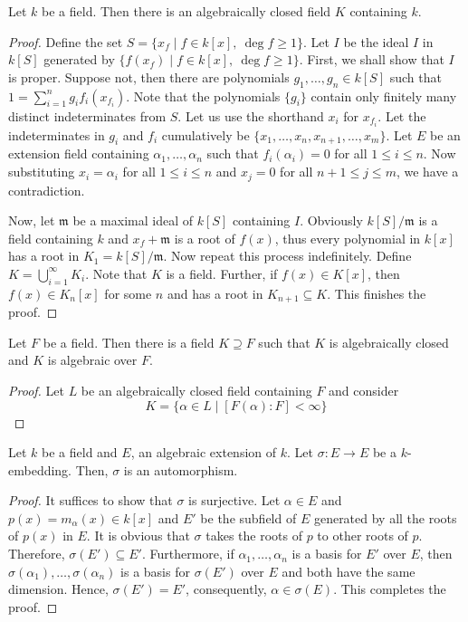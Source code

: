 \begin{theorem}
    Let $k$ be a field. Then there is an algebraically closed field $K$ containing $k$.
\end{theorem}
\begin{proof}
    Define the set $S = \{x_f\mid f\in k[x],~\deg f\ge 1\}$. Let $I$ be the ideal $I$ in $k[S]$ generated by $\{f(x_f)\mid f\in k[x],~\deg f\ge 1\}$. First, we shall show that $I$ is proper. Suppose not, then there are polynomials $g_1,\ldots,g_n\in k[S]$ such that $1 = \sum_{i = 1}^ng_if_i(x_{f_i})$. Note that the polynomials $\{g_i\}$ contain only finitely many distinct indeterminates from $S$. Let us use the shorthand $x_i$ for $x_{f_i}$. Let the indeterminates in $g_i$ and $f_i$ cumulatively be $\{x_1,\ldots,x_n,x_{n + 1},\ldots,x_m\}$. Let $E$ be an extension field containing $\alpha_1,\ldots,\alpha_n$ such that $f_i(\alpha_i) = 0$ for all $1\le i\le n$. Now substituting $x_i = \alpha_i$ for all $1\le i\le n$ and $x_j = 0$ for all $n + 1\le j\le m$, we have a contradiction.


    Now, let $\mathfrak{m}$ be a maximal ideal of $k[S]$ containing $I$. Obviously $k[S]/\mathfrak{m}$ is a field containing $k$ and $x_f + \mathfrak{m}$ is a root of $f(x)$, thus every polynomial in $k[x]$ has a root in $K_1 = k[S]/\mathfrak{m}$. Now repeat this process indefinitely. Define $K = \bigcup_{i = 1}^\infty K_i$. Note that $K$ is a field. Further, if $f(x)\in K[x]$, then $f(x)\in K_n[x]$ for some $n$ and has a root in $K_{n + 1}\subseteq K$. This finishes the proof.
\end{proof}

\begin{corollary}
    Let $F$ be a field. Then there is a field $K\supseteq F$ such that $K$ is algebraically closed and $K$ is algebraic over $F$.
\end{corollary}
\begin{proof}
    Let $L$ be an algebraically closed field containing $F$ and consider 
    \begin{equation*}
        K = \{\alpha\in L\mid [F(\alpha):F] < \infty\}
    \end{equation*}
\end{proof}

\begin{theorem}
    Let $k$ be a field and $E$, an algebraic extension of $k$. Let $\sigma:E\to E$ be a $k$-embedding. Then, $\sigma$ is an automorphism.
\end{theorem}
\begin{proof}
    It suffices to show that $\sigma$ is surjective. Let $\alpha\in E$ and $p(x) = m_\alpha(x)\in k[x]$ and $E'$ be the subfield of $E$ generated by all the roots of $p(x)$ in $E$. It is obvious that $\sigma$ takes the roots of $p$ to other roots of $p$. Therefore, $\sigma(E')\subseteq E'$. Furthermore, if $\alpha_1,\ldots,\alpha_n$ is a basis for $E'$ over $E$, then $\sigma(\alpha_1),\ldots,\sigma(\alpha_n)$ is a basis for $\sigma(E')$ over $E$ and both have the same dimension. Hence, $\sigma(E') = E'$, consequently, $\alpha\in\sigma(E)$. This completes the proof.
\end{proof}

